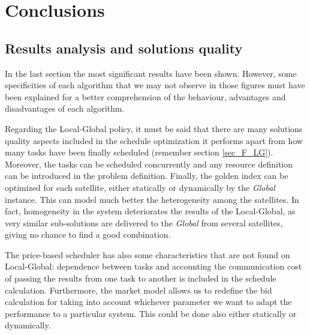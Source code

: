
\chapter{Conclusions} %

\label{Chapter5} %


\section{Results analysis and solutions quality}

In the last section the most significant results have been shown. However, some specificities of each algorithm that we may not observe in those figures must have been explained for a better comprehension of the behaviour, advantages and disadvantages of each algorithm.

Regarding the Local-Global policy, it must be said that there are many solutions quality aspects included in the schedule optimization it performs apart from how many tasks have been finally scheduled (remember section \ref{sec_F_LG}). Moreover, the tasks can be scheduled concurrently and any resource definition can be introduced in the problem definition. Finally, the golden index can be optimized for each satellite, either statically or dynamically by the \emph{Global} instance. This can model much better the heterogeneity among the satellites. In fact, homogeneity in the system deteriorates the results of the Local-Global, as very similar sub-solutions are delivered to the \emph{Global} from several satellites, giving no chance to find a good combination.

The price-based scheduler has also some characteristics that are not found on Local-Global: dependence between tasks and accounting the communication cost of passing the results from one task to another is included in the schedule calculation. Furthermore, the market model allows us to redefine the bid calculation for taking into account whichever parameter we want to adapt the performance to a particular system. This could be done also either statically or dynamically.

